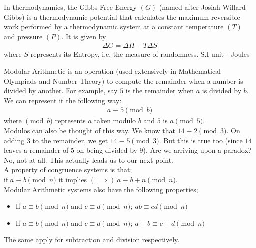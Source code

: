 \begin{chembox}{}
{In thermodynamics, the {Gibbs Free Energy} $(G)$ (named after Josiah Willard Gibbs) is a {thermodynamic potential} that calculates the {maximum reversible work} performed by a thermodynamic system at a {constant temperature} $(T)$ and pressure{} $(P)$. It is given by 
\begin{align*} 
    \Delta G=\Delta H-T\Delta S 
\end{align*} where $S$ represents its {Entropy}, i.e. the measure of randomness. {S.I unit - Joules}}
\end{chembox}
\begin{mathbox}{}
{Modular Arithmetic is an operation (used extensively in Mathematical Olympiads and Number Theory) to compute the remainder when a number is divided by another. For example, say $5$ is the remainder when $a$ is divided by $b$. We can represent it the following way:
\begin{align*}
    a \equiv 5 \pmod b
\end{align*}
where $\pmod b$ represents $a$ taken modulo $b$ and $5$ is $a \pmod 5$.}\\
Modulos can also be thought of this way. We know that $14 \equiv 2 \pmod 3$. On adding $3$ to the remainder, we get $14 \equiv 5 \pmod 3$. But this is true too (since $14$ leaves a remainder of 5 on being divided by $9$). Are we arriving upon a paradox? No, not at all.
This actually leads us to our next point.\\
A property of congruence systems is that;\\
if $a \equiv b \pmod n$ it implies $(\implies)~a \equiv b + n \pmod n$.\\
Modular Arithmetic systems also have the following properties;
\begin{itemize}
    \item{If $a \equiv b \pmod n$ and $c \equiv d \pmod n;~ab \equiv cd \pmod n$}
    \item{If $a \equiv b \pmod n$ and $c \equiv d \pmod n;~a + b \equiv c + d \pmod n$}
\end{itemize}
The same apply for subtraction and division respectively.
\end{mathbox}
